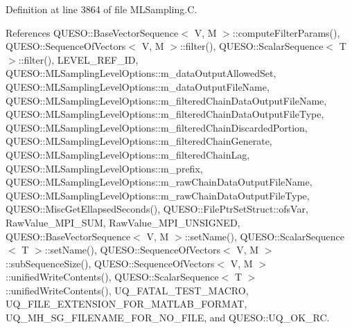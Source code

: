 Definition at line 3864 of file M\-L\-Sampling.\-C.



References Q\-U\-E\-S\-O\-::\-Base\-Vector\-Sequence$<$ V, M $>$\-::compute\-Filter\-Params(), Q\-U\-E\-S\-O\-::\-Sequence\-Of\-Vectors$<$ V, M $>$\-::filter(), Q\-U\-E\-S\-O\-::\-Scalar\-Sequence$<$ T $>$\-::filter(), L\-E\-V\-E\-L\-\_\-\-R\-E\-F\-\_\-\-I\-D, Q\-U\-E\-S\-O\-::\-M\-L\-Sampling\-Level\-Options\-::m\-\_\-data\-Output\-Allowed\-Set, Q\-U\-E\-S\-O\-::\-M\-L\-Sampling\-Level\-Options\-::m\-\_\-data\-Output\-File\-Name, Q\-U\-E\-S\-O\-::\-M\-L\-Sampling\-Level\-Options\-::m\-\_\-filtered\-Chain\-Data\-Output\-File\-Name, Q\-U\-E\-S\-O\-::\-M\-L\-Sampling\-Level\-Options\-::m\-\_\-filtered\-Chain\-Data\-Output\-File\-Type, Q\-U\-E\-S\-O\-::\-M\-L\-Sampling\-Level\-Options\-::m\-\_\-filtered\-Chain\-Discarded\-Portion, Q\-U\-E\-S\-O\-::\-M\-L\-Sampling\-Level\-Options\-::m\-\_\-filtered\-Chain\-Generate, Q\-U\-E\-S\-O\-::\-M\-L\-Sampling\-Level\-Options\-::m\-\_\-filtered\-Chain\-Lag, Q\-U\-E\-S\-O\-::\-M\-L\-Sampling\-Level\-Options\-::m\-\_\-prefix, Q\-U\-E\-S\-O\-::\-M\-L\-Sampling\-Level\-Options\-::m\-\_\-raw\-Chain\-Data\-Output\-File\-Name, Q\-U\-E\-S\-O\-::\-M\-L\-Sampling\-Level\-Options\-::m\-\_\-raw\-Chain\-Data\-Output\-File\-Type, Q\-U\-E\-S\-O\-::\-Misc\-Get\-Ellapsed\-Seconds(), Q\-U\-E\-S\-O\-::\-File\-Ptr\-Set\-Struct\-::ofs\-Var, Raw\-Value\-\_\-\-M\-P\-I\-\_\-\-S\-U\-M, Raw\-Value\-\_\-\-M\-P\-I\-\_\-\-U\-N\-S\-I\-G\-N\-E\-D, Q\-U\-E\-S\-O\-::\-Base\-Vector\-Sequence$<$ V, M $>$\-::set\-Name(), Q\-U\-E\-S\-O\-::\-Scalar\-Sequence$<$ T $>$\-::set\-Name(), Q\-U\-E\-S\-O\-::\-Sequence\-Of\-Vectors$<$ V, M $>$\-::sub\-Sequence\-Size(), Q\-U\-E\-S\-O\-::\-Sequence\-Of\-Vectors$<$ V, M $>$\-::unified\-Write\-Contents(), Q\-U\-E\-S\-O\-::\-Scalar\-Sequence$<$ T $>$\-::unified\-Write\-Contents(), U\-Q\-\_\-\-F\-A\-T\-A\-L\-\_\-\-T\-E\-S\-T\-\_\-\-M\-A\-C\-R\-O, U\-Q\-\_\-\-F\-I\-L\-E\-\_\-\-E\-X\-T\-E\-N\-S\-I\-O\-N\-\_\-\-F\-O\-R\-\_\-\-M\-A\-T\-L\-A\-B\-\_\-\-F\-O\-R\-M\-A\-T, U\-Q\-\_\-\-M\-H\-\_\-\-S\-G\-\_\-\-F\-I\-L\-E\-N\-A\-M\-E\-\_\-\-F\-O\-R\-\_\-\-N\-O\-\_\-\-F\-I\-L\-E, and Q\-U\-E\-S\-O\-::\-U\-Q\-\_\-\-O\-K\-\_\-\-R\-C.


